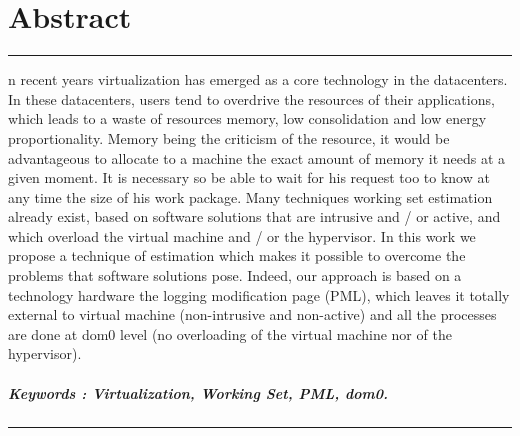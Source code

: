 %
%
%

\chapter*{Abstract}
{
\setstretch{}
\noindent\rule[3pt]{\textwidth}{1pt}
\vspace{.2cm}

n recent years virtualization has emerged as a core technology in the datacenters. In these datacenters, users tend to overdrive the resources of their applications, which leads to a waste of resources memory, low consolidation and low energy proportionality. Memory being the criticism of the resource, it would be advantageous to allocate to a machine the exact amount of memory it needs at a given moment. It is necessary so be able to wait for his request too to know at any time the size of his work package. Many techniques working set estimation already exist, based on software solutions that are intrusive and / or active, and which overload the virtual machine and / or the hypervisor. In this work we propose a technique of estimation which makes it possible to overcome the problems that software solutions pose. Indeed, our approach is based on a technology hardware the logging modification page (PML), which leaves it totally external to virtual machine (non-intrusive and non-active) and all the processes are done at dom0 level (no overloading of the virtual machine nor of the hypervisor).

\paragraph{Keywords : Virtualization, Working Set, PML, dom0.}

\vspace{.2cm}
\noindent\rule[3pt]{\textwidth}{1pt}
}
\clearpage